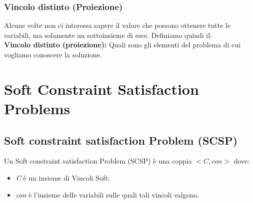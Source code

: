 \subsection{Vincolo distinto (Proiezione)}
Alcune volte non ci interessa sapere il valore che possono ottenere tutte le
variabili, ma solamente un sottoinsieme di esse. Definiamo quindi il: \\
\textbf{Vincolo distinto (proiezione):} Quali sono gli elementi del problema di
cui vogliamo conoscere la soluzione.

\chapter{Soft Constraint Satisfaction Problems} \label{ch:Soft Constraint
    Satisfaction Problems}
\section{Soft constraint satisfaction Problem (SCSP)}
Un Soft constraint satisfaction Problem (SCSP) è una coppia $<C, con>$ dove:
\begin{itemize}
    \item \textit{C} è un insieme di Vincoli Soft;
    \item \textit{con} è l'insieme delle variabili sulle quali tali vincoli
          valgono.
\end{itemize}

